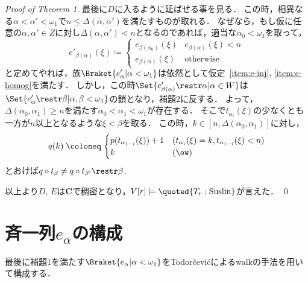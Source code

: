 \documentclass[a4j]{ltjsarticle}
\renewcommand{\defeq}{\mathrel{\coloneq}}
\begin{document}
\begin{proof}[Proof of Theorem 1]
 最後に$D$に入るように延ばせる事を見る．
 この時，相異なる$\alpha < \alpha' < \omega_1$で$n \leq \Delta(\alpha, \alpha')$を満たすものが取れる．
 なぜなら，もし仮に任意の$\alpha, \alpha' \in Z$に対し$\Delta(\alpha, \alpha') < n$となるのであれば，適当な$\alpha_0 < \omega_1$を取って，
 \[
  e'_{\beta(\alpha)}(\xi) \defeq \begin{cases}
                                  e_{\beta(\alpha_0)}(\xi) & e_{\beta(\alpha)}(\xi) < n\\
                                  e_{\beta(\alpha)}(\xi)   & \text{otherwise}
                                 \end{cases}
 \]
 と定めてやれば，族$\Braket{e'_\alpha | \alpha < \omega_1}$は依然として仮定~\ref{item:e-inj}, \ref{item:e-homog}を満たす．
 しかし，この時$\Set{e'_{\beta(\alpha)} \restr \alpha | \alpha \in W}$は$\Set{e'_\alpha \restr \beta | \alpha, \beta < \omega_1}$の鎖となり，補題2に反する．
 よって，$\Delta(\alpha_0, \alpha_1) \geq n$を満たす$\alpha_0 < \alpha_1 < \omega_1$が存在する．
 そこで$t_{\alpha_i}(\xi)$の少なくとも一方が$n$以上となるような$\xi < \beta$を取る．
 この時，$k \in [n, \Delta(\alpha_0, \alpha_1)]$に対し，
 \[
  q(k) \defeq
  \begin{cases}
   p(t_{\alpha_{1-i}}(\xi)) + 1 & (t_{\alpha_i}(\xi) = k, t_{\alpha_{1-i}}(\xi) < n)\\
   k & (\ow)
 \end{cases}
 \]
 とおけば$q \circ t_\beta \neq q \circ t_{\beta'} \restr \beta$.

 以上より$D$, $E$は$\mathbf{C}$で稠密となり，$V[r] \models \quoted{T_r: \text{Suslin}}$が言えた． \qed
\end{proof}

\section{斉一列$e_\alpha$の構成}
最後に補題1を満たす$\Braket{e_\alpha | \alpha < \omega_1}$をTodor\v{c}evi\'{c}によるwalkの手法を用いて構成する．
\end{document}
